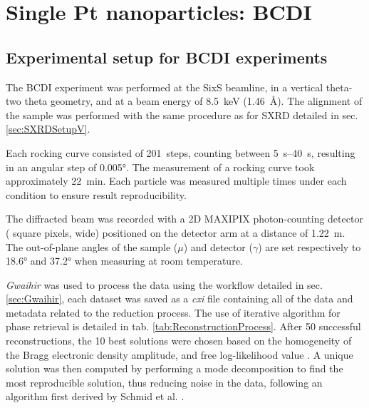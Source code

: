 \section{Single Pt nanoparticles: BCDI}\label{sec:BCDINanoparticles}

\subsection{Experimental setup for BCDI experiments}\label{sec:BCDISetup}

The BCDI experiment was performed at the SixS beamline, in a vertical theta-two theta geometry, and at a beam energy of \qty{8.5}{\keV} (\qty{1.46}{\angstrom}).
The alignment of the sample was performed with the same procedure as for SXRD detailed in sec. \ref{sec:SXRDSetupV}.

Each rocking curve consisted of \qty{201}{steps}, counting between \qtyrange{5}{40}{\second}, resulting in an angular step of \ang{0.005}.
The measurement of a rocking curve took approximately \qty{22}{\minute}.
Each particle was measured multiple times under each condition to ensure result reproducibility.

The diffracted beam was recorded with a 2D MAXIPIX photon-counting detector ( square pixels,  wide) positioned on the detector arm at a distance of \qty{1.22}{\meter}.
The out-of-plane angles of the sample ($\mu$) and detector ($\gamma$) are set respectively to \ang{18.6} and \ang{37.2} when measuring at room temperature.

\textit{Gwaihir} was used to process the data using the workflow detailed in sec. \ref{sec:Gwaihir}, each dataset was saved as a \textit{cxi} file containing all of the data and metadata related to the reduction process.
The use of iterative algorithm for phase retrieval is detailed in tab. \ref{tab:ReconstructionProcess}.
After 50 successful reconstructions, the 10 best solutions were chosen based on the homogeneity of the Bragg electronic density amplitude, and free log-likelihood value \parencite{FavreNicolin2020a}.
A unique solution was then computed by performing a mode decomposition to find the most reproducible solution, thus reducing noise in the data, following an algorithm first derived by Schmid et al. \parencite*{Schmid2010}.

